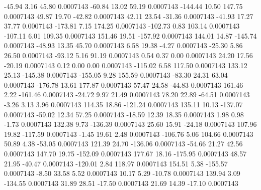       -45.94        3.16       45.80     0.0007143
      -60.84       13.02       59.19     0.0007143
     -144.44       10.50      147.75     0.0007143
       49.87       19.70      -42.82     0.0007143
       42.11       23.54      -31.36     0.0007143
      -41.93       17.27       37.77     0.0007143
     -173.81        7.15      174.25     0.0007143
     -102.73        0.83      103.14     0.0007143
     -107.11        6.01      109.35     0.0007143
      151.46       19.51     -157.92     0.0007143
      144.01       14.87     -145.74     0.0007143
      -48.93       13.35       45.70     0.0007143
        6.58       19.38       -4.27     0.0007143
      -25.30        5.86       26.50     0.0007143
      -93.12        5.16       91.19     0.0007143
        0.54        0.37        0.00     0.0007143
       24.20       17.56      -20.19     0.0007143
        0.12        0.00        0.00     0.0007143
     -115.02        6.58      117.50     0.0007143
      133.12       25.13     -145.38     0.0007143
     -155.05        9.28      155.59     0.0007143
      -83.30       24.31       63.04     0.0007143
     -176.78       13.61      177.87     0.0007143
       57.47       24.58      -44.83     0.0007143
      161.46        2.22     -161.46     0.0007143
      -24.72        9.97       21.49     0.0007143
       78.20       22.89      -64.51     0.0007143
       -3.26        3.13        3.96     0.0007143
      114.35       18.86     -121.24     0.0007143
      135.11       10.13     -137.07     0.0007143
      -59.02       12.34       57.25     0.0007143
      -18.59       12.39       18.35     0.0007143
        1.98        0.98       -1.73     0.0007143
      132.38        9.73     -136.39     0.0007143
       25.60       15.91      -24.18     0.0007143
      107.96       19.82     -117.59     0.0007143
       -1.45       19.61        2.48     0.0007143
     -106.76        5.06      104.66     0.0007143
       50.89        4.38      -53.05     0.0007143
      121.39       24.70     -136.06     0.0007143
      -54.66       21.27       42.56     0.0007143
      147.70       19.75     -152.09     0.0007143
      177.67       18.16     -175.95     0.0007143
       48.57       21.95      -40.47     0.0007143
     -120.01        2.84      118.97     0.0007143
      154.51        5.38     -155.57     0.0007143
       -8.50       33.58        5.52     0.0007143
       10.17        5.29      -10.78     0.0007143
      139.94        3.09     -134.55     0.0007143
       31.89       28.51      -17.50     0.0007143
       21.69       14.39      -17.10     0.0007143
